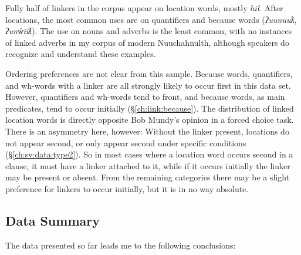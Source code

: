 Fully half of linkers in the corpus appear on location words, mostly \textit{hił}. After locations, the most common uses are on quantifiers and because words (\textit{ʔuunuuƛ}, \textit{ʔunw̓iiƛ}). The use on nouns and adverbs is the least common, with no instances of linked adverbs in my corpus of modern Nuuchahnulth, although speakers do recognize and understand these examples.

Ordering preferences are not clear from this sample. Because words, quantifiers, and wh-words with a linker are all strongly likely to occur first in this data set. However, quantifiers and wh-words tend to front, and because words, as main predicates, tend to occur initially (\S\ref{ch:link:because}). The distribution of linked location words is directly opposite Bob Mundy's opinion in a forced choice task. There is an asymmetry here, however: Without the linker present, locations do not appear second, or only appear second under specific conditions (\S\ref{ch:sv:data:type2}). So in most cases where a location word occurs second in a clause, it must have a linker attached to it, while if it occurs initially the linker may be present or absent. From the remaining categories there may be a slight preference for linkers to occur initially, but it is in no way absolute.

\subsection{Data Summary}

The data presented so far leads me to the following conclusions:

